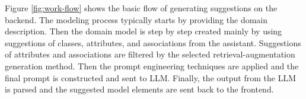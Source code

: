 Figure \ref{fig:work-flow} shows the basic flow of generating suggestions on the backend. The modeling process typically starts by providing the domain description. Then the domain model is step by step created mainly by using suggestions of classes, attributes, and associations from the assistant. Suggestions of attributes and associations are filtered by the selected retrieval-augmentation generation method. Then the prompt engineering techniques are applied and the final prompt is constructed and sent to LLM. Finally, the output from the LLM is parsed and the suggested model elements are sent back to the frontend.